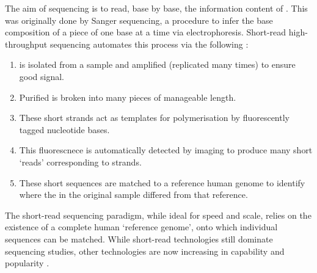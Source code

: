 \documentclass[thesis.tex]{subfiles}
\begin{document}
The aim of sequencing is to read, base by base, the information content of . This was originally done by Sanger sequencing, a procedure to infer the base composition of a piece of  one base at a time \citep{sanger_dna_1977} via electrophoresis. Short-read high-throughput sequencing automates this process via the following  \citep{bentley_accurate_2008}:

\begin{enumerate}
    \item {} is isolated from a sample and amplified (replicated many times) to ensure good signal.
    \item Purified  is broken into many pieces of manageable length.
    \item These short strands act as templates for polymerisation by fluorescently tagged nucleotide bases.
    \item This fluorescnece is automatically detected by imaging to produce many short `reads' corresponding to strands.
    \item These short sequences are matched to a reference human genome to identify where the  in the original sample differed from that reference.
\end{enumerate}

The short-read sequencing paradigm, while ideal for speed and scale, relies on the existence of a complete human `reference genome', onto which individual sequences can be matched. While short-read technologies still dominate sequencing studies, other technologies are now increasing in capability and popularity \citep{jain_oxford_2016}.
\end{document}
